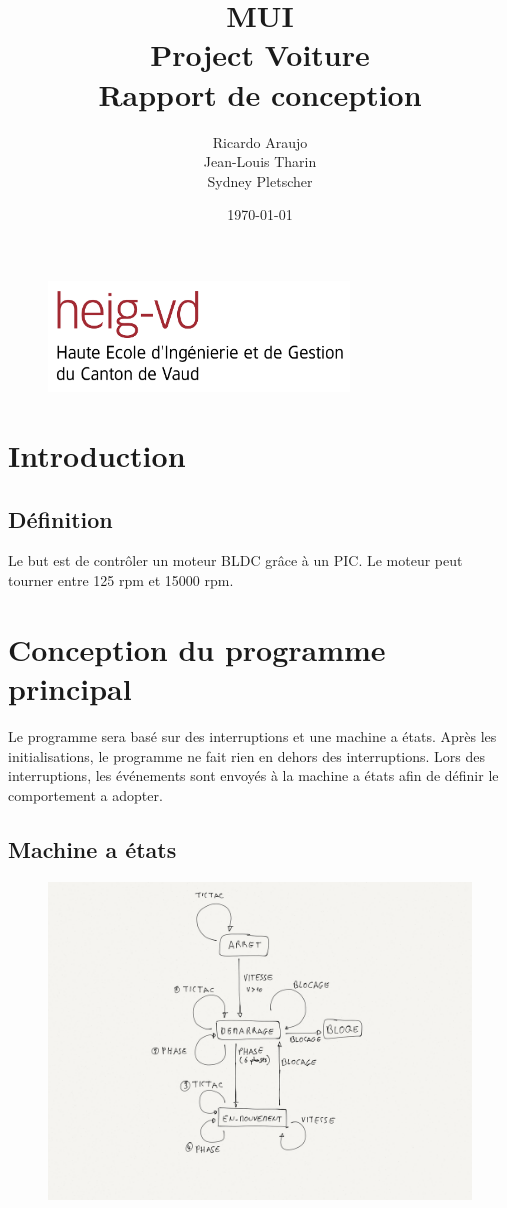 \documentclass[fleqn, 11pt, a4paper]{article}
\author{Ricardo Araujo\\
  Jean-Louis Tharin\\
  Sydney Pletscher}
\title{MUI\\
Project Voiture\\
 Rapport de conception}
\date{\today}
\begin{document}
\maketitle
\vspace{8cm}
\begin{figure}[H]
\includegraphics[width=8cm]{heig-vd_logo_couleur_format_jpg}
\centering
\end{figure}

\newpage

\tableofcontents

\newpage

\section{Introduction}
	\subsection{Définition}
	Le but est de contrôler un moteur BLDC grâce à un PIC.
	Le moteur peut tourner entre 125 rpm et 15000 rpm.

\section{Conception du programme principal}
Le programme sera basé sur des interruptions et une machine a états.
Après les initialisations, le programme ne fait rien en dehors des interruptions.
Lors des interruptions, les événements sont envoyés à la machine a états afin de définir le comportement a adopter.

  \subsection{Machine a états}
  \begin{figure}[H]
  \includegraphics[width=12cm]{state_machine}
  \centering
  \end{figure}
\end{document}
